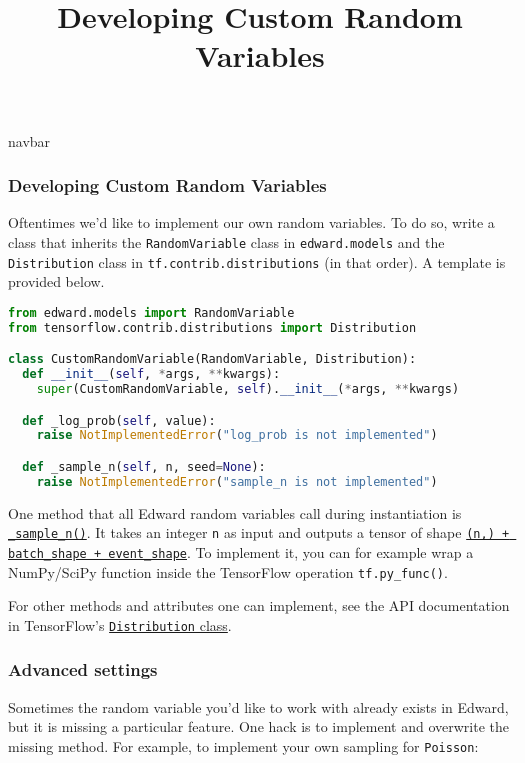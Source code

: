 \title{Developing Custom Random Variables}

{{navbar}}

\subsubsection{Developing Custom Random Variables}

Oftentimes we'd like to implement our own random variables.
To do so, write a class that inherits
the \texttt{RandomVariable} class in \texttt{edward.models} and
the \texttt{Distribution} class in \texttt{tf.contrib.distributions} (in that
order). A template is provided below.

\begin{lstlisting}[language=Python]
from edward.models import RandomVariable
from tensorflow.contrib.distributions import Distribution

class CustomRandomVariable(RandomVariable, Distribution):
  def __init__(self, *args, **kwargs):
    super(CustomRandomVariable, self).__init__(*args, **kwargs)

  def _log_prob(self, value):
    raise NotImplementedError("log_prob is not implemented")

  def _sample_n(self, n, seed=None):
    raise NotImplementedError("sample_n is not implemented")
\end{lstlisting}

One method that all Edward random variables call during instantiation is
\href{https://github.com/tensorflow/tensorflow/blob/master/tensorflow/contrib/distributions/python/ops/distribution.py#L557}{\texttt{_sample_n()}}.
It takes an integer \texttt{n} as input and outputs a tensor of shape
\href{https://github.com/tensorflow/tensorflow/blob/master/tensorflow/contrib/distributions/python/ops/distribution.py#L213}{\texttt{(n,) + batch_shape + event_shape}}.
To implement it, you can for example wrap a NumPy/SciPy function
inside the TensorFlow operation \texttt{tf.py_func()}.

For other methods and attributes one can implement, see the API documentation in
TensorFlow's
\href{https://www.tensorflow.org/versions/master/api_docs/python/contrib.distributions/base_classes#Distribution}{\texttt{Distribution} class}.

\subsubsection{Advanced settings}

Sometimes the random variable you'd like to work with already exists
in Edward, but it is missing a particular feature. One hack is to
implement and overwrite the missing method. For example, to implement
your own sampling for \texttt{Poisson}:

